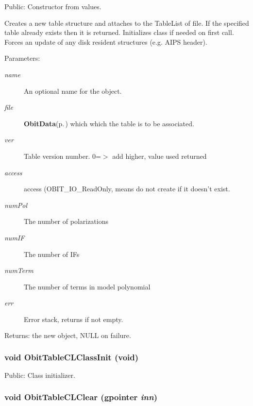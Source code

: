 Public: Constructor from values. 

Creates a new table structure and attaches to the Table\-List of file. If the specified table already exists then it is returned. Initializes class if needed on first call. Forces an update of any disk resident structures (e.g. AIPS header). \begin{Desc}
\item[Parameters:]
\begin{description}
\item[{\em name}]An optional name for the object. \item[{\em file}]{\bf Obit\-Data}{\rm (p.\,\pageref{structObitData})} which which the table is to be associated. \item[{\em ver}]Table version number. 0=$>$ add higher, value used returned \item[{\em access}]access (OBIT\_\-IO\_\-Read\-Only, means do not create if it doesn't exist. \item[{\em num\-Pol}]The number of polarizations \item[{\em num\-IF}]The number of IFs \item[{\em num\-Term}]The number of terms in model polynomial \item[{\em err}]Error stack, returns if not empty. \end{description}
\end{Desc}
\begin{Desc}
\item[Returns:]the new object, NULL on failure. \end{Desc}
\subsubsection{\setlength{\rightskip}{0pt plus 5cm}void Obit\-Table\-CLClass\-Init (void)}\label{ObitTableCL_8c_a27}


Public: Class initializer. 

\subsubsection{\setlength{\rightskip}{0pt plus 5cm}void Obit\-Table\-CLClear (gpointer {\em inn})}\label{ObitTableCL_8c_a9}


